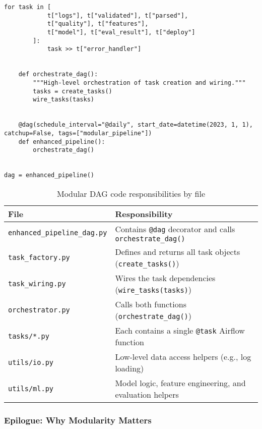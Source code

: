 \begin{lstlisting}[caption={Airflow DAG with parallel data quality validation and feature engineering before training.}, label={lst:airflowdag_parallel}]
        for task in [
            t["logs"], t["validated"], t["parsed"],
            t["quality"], t["features"],
            t["model"], t["eval_result"], t["deploy"]
        ]:
            task >> t["error_handler"]
    
    
    def orchestrate_dag():
        """High-level orchestration of task creation and wiring."""
        tasks = create_tasks()
        wire_tasks(tasks)
    
    
    @dag(schedule_interval="@daily", start_date=datetime(2023, 1, 1), catchup=False, tags=["modular_pipeline"])
    def enhanced_pipeline():
        orchestrate_dag()
    
    
dag = enhanced_pipeline()
\end{lstlisting}
    
\begin{table}[H]
    \centering
    \begin{tabular}{|l|p{10cm}|}
    \hline
    \textbf{File} & \textbf{Responsibility} \\
    \hline
    \texttt{enhanced\_pipeline\_dag.py} & Contains \texttt{@dag} decorator and calls \texttt{orchestrate\_dag()} \\
    \hline
    \texttt{task\_factory.py} & Defines and returns all task objects (\texttt{create\_tasks()}) \\
    \hline
    \texttt{task\_wiring.py} & Wires the task dependencies (\texttt{wire\_tasks(tasks)}) \\
    \hline
    \texttt{orchestrator.py} & Calls both functions (\texttt{orchestrate\_dag()}) \\
    \hline
    \texttt{tasks/*.py} & Each contains a single \texttt{@task} Airflow function \\
    \hline
    \texttt{utils/io.py} & Low-level data access helpers (e.g., log loading) \\
    \hline
    \texttt{utils/ml.py} & Model logic, feature engineering, and evaluation helpers \\
    \hline
    \end{tabular}
    \caption{Modular DAG code responsibilities by file}
    \label{tab:dag_structure}
\end{table}
    

    





\subsubsection*{Epilogue: Why Modularity Matters}

